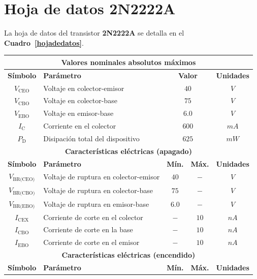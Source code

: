 \documentclass[letter,twoside,11pt]{article}
\begin{document}
\section{Hoja de datos 2N2222A}
La hoja de datos del transistor \textbf{2N2222A} se detalla en el
\textbf{Cuadro~\ref{hojadedatos}}.

\begin{table}[!h]
\begin{center}
    \begin{tabular}{|c|l|c|c|c|}
    \hline
    \multicolumn{5}{|c|}{\textbf{Valores nominales absolutos máximos}}
    \tabularnewline \hline
    \textbf{Símbolo} &
    \textbf{Parámetro} &
    \multicolumn{2}{|c|}{\textbf{Valor}} &
    \textbf{Unidades}
    \tabularnewline \hline \hline
    $V_{\text{CEO}}$ &
    Voltaje en colector-emisor &
    \multicolumn{2}{|c|}{$40$} & $V$
    \tabularnewline \hline
    $V_{\text{CBO}}$ &
    Voltaje en colector-base &
    \multicolumn{2}{|c|}{$75$} &
    $V$
    \tabularnewline \hline
    $V_{\text{EBO}}$ &
    Voltaje en emisor-base &
    \multicolumn{2}{|c|}{$6.0$} &
    $V$
    \tabularnewline \hline
    $I_{\text{C}}$ &
    Corriente en el colector &
    \multicolumn{2}{|c|}{$600$} &
    $mA$
    \tabularnewline \hline
    $P_{\text{D}}$ &
    Disipación total del dispositivo &
    \multicolumn{2}{|c|}{$625$} &
    $mW$
    \tabularnewline \hline
    \multicolumn{5}{|c|}{\textbf{Características eléctricas (apagado)}}
    \tabularnewline \hline
    \textbf{Símbolo} &
    \textbf{Parámetro} &
    \textbf{Mín.} &
    \textbf{Máx.} &
    \textbf{Unidades}
    \tabularnewline \hline \hline
    $V_{\text{BR(CEO)}}$ &
    Voltaje de ruptura en colector-emisor &
    $40$ &
    $-$ &
    $V$
    \tabularnewline \hline
    $V_{\text{BR(CBO)}}$ &
    Voltaje de ruptura en colector-base &
    $75$ &
    $-$ &
    $V$
    \tabularnewline \hline
    $V_{\text{BR(EBO)}}$ &
    Voltaje de ruptura en emisor-base &
    $6.0$ &
    $-$ &
    $V$
    \tabularnewline \hline
    $I_{\text{CEX}}$ &
    Corriente de corte en el colector &
    $-$ &
    $10$ &
    $nA$
    \tabularnewline \hline
    $I_{\text{CBO}}$ &
    Corriente de corte en la base &
    $-$ &
    $10$ &
    $nA$
    \tabularnewline \hline
    $I_{\text{EBO}}$ &
    Corriente de corte en el emisor &
    $-$ &
    $10$ &
    $nA$
    \tabularnewline \hline
    \multicolumn{5}{|c|}{\textbf{Características eléctricas (encendido)}}
    \tabularnewline \hline
    \textbf{Símbolo} &
    \textbf{Parámetro} &
    \textbf{Mín.} &
    \textbf{Máx.} &
    \textbf{Unidades}
    \tabularnewline \hline \hline

\end{tabular}
\end{center}
\end{table}
\end{document}
